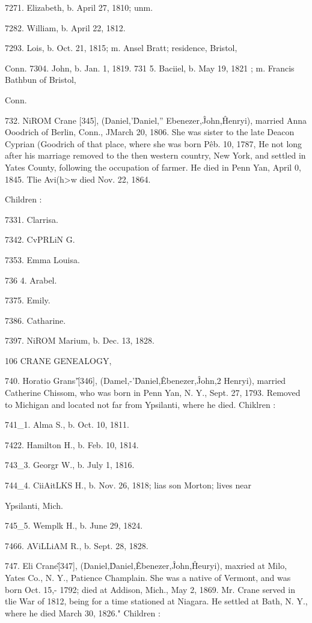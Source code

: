 \documentclass{book}
\begin{document}
7271. Elizabeth, b. April 27, 1810; unm. 

7282. William, b. April 22, 1812. 

7293. Lois, b. Oct. 21, 1815; m. Ansel Bratt; residence, Bristol, 

Conn. 
7304. John, b. Jan. 1, 1819. 
731  5. Baciiel, b. May 19, 1821 ; m. Francis Bathbun of Bristol, 

Conn. 

732. NiROM Crane [345], (Daniel,'\^ Daniel,'' Ebenezer,\^ 
John,\^ Henryi), married Anna Ooodrich of Berlin, Conn., JMarch 
20, 1806. She was sister to the late Deacon Cyprian (Goodrich 
of that place, where she was born P\^eb. 10, 1787, He not long 
after his marriage removed to the then western country, New 
York, and settled in Yates County, following the occupation of 
farmer. He died in Penn Yan, April 0, 1845. Tlie Avi(h>w died 
Nov. 22, 1864. 

Children : 

7331. Clarrisa. 

7342. CvPRLiN G. 

7353. Emma Louisa. 

736  4. Arabel. 

7375. Emily. 

7386. Catharine. 

7397. NiROM Marium, b. Dec. 13, 1828. 



106 CRANE GENEALOGY, 

740. Horatio Grans'\^ [346], (Damel,-'\^ Daniel,\^ Ebenezer,\^ 
John,2 Henryi), married Catherine Chissom, who was born in 
Penn Yan, N. Y., Sept. 27, 1793. Removed to Michigan and 
located not far from Ypsilanti, where he died. Chiklren : 

741\_1. Alma S., b. Oct. 10, 1811. 

7422. Hamilton H., b. Feb. 10, 1814. 

743\_3. Georgr W., b. July 1, 1816. 

744\_4. CiiAitLKS H., b. Nov. 26, 1818; lias son Morton; lives near 

Ypsilanti, Mich. 

745\_5. Wemplk H., b. June 29, 1824. 

7466. AViLLiAM R., b. Sept. 28, 1828. 

747. Eli Crane\^ [347], (Daniel,\^ Daniel,\^ Ebenezer,\^ John,\^ 
Heuryi), maxried at Milo, Yates Co., N. Y., Patience Champlain. 
She was a native of Vermont, and was born Oct. 15,- 1792; died 
at Addison, Mich., May 2, 1869. Mr. Crane served in tlie War 
of 1812, being for a time stationed at Niagara. He settled at 
Bath, N. Y., where he died March 30, 1826." Children : 
\end{document}
